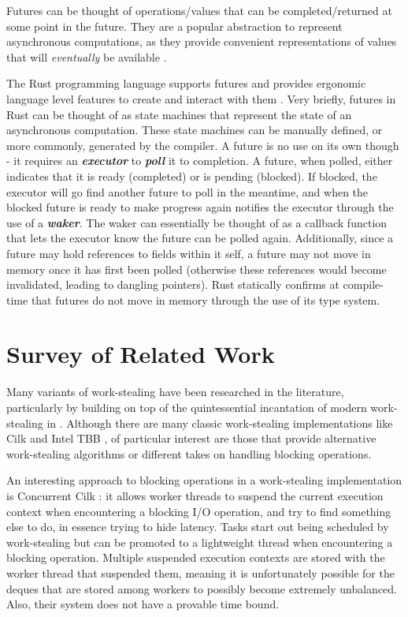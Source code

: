 \documentclass[bsc,frontabs,singlespacing,parskip,deptreport,normalheadings]{infthesis}
\begin{document}
Futures can be thought of operations/values that can be completed/returned at
some point in the future. They are a popular abstraction to represent
asynchronous computations, as they provide convenient representations of values
that will \textit{eventually} be available \cite{halstead_implementation_1984,
halstead_multilisp_1985}.

The Rust programming language supports futures and provides ergonomic language
level features to create and interact with them \cite{noauthor_future_nodate}.
Very briefly, futures in Rust can be thought of as state machines that represent
the state of an asynchronous computation. These state machines can be manually
defined, or more commonly, generated by the compiler. A future is no use on its
own though - it requires an \textit{\textbf{executor}} to \textbf{\textit{poll}}
it to completion. A future, when polled, either indicates that it is ready
(completed) or is pending (blocked). If blocked, the executor will go find
another future to poll in the meantime, and when the blocked future is ready to
make progress again notifies the executor through the use of a
\textbf{\textit{waker}}. The waker can essentially be thought of as a callback
function that lets the executor know the future can be polled again.
Additionally, since a future may hold references to fields within it self, a
future may not move in memory once it has first been polled (otherwise these
references would become invalidated, leading to dangling pointers). Rust
statically confirms at compile-time that futures do not move in memory through
the use of its type system.

\section{Survey of Related Work}
\label{section:survey_of_related_work}

Many variants of work-stealing have been researched in the literature,
particularly by building on top of the quintessential incantation of modern
work-stealing in \cite{arora_thread_1998}. Although there are many classic
work-stealing implementations like Cilk \cite{frigo_implementation_1998} and Intel
TBB \cite{noauthor_advanced_nodate}, of particular interest are those that
provide alternative work-stealing algorithms or different takes on handling
blocking operations.

An interesting approach to blocking operations in a work-stealing implementation
is Concurrent Cilk \cite{zakian_concurrent_2016}: it allows worker threads to
suspend the current execution context when encountering a blocking I/O
operation, and try to find something else to do, in essence trying to hide
latency. Tasks start out being scheduled by work-stealing but can be promoted to
a lightweight thread when encountering a blocking operation. Multiple suspended
execution contexts are stored with the worker thread that suspended them,
meaning it is unfortunately possible for the deques that are stored among
workers to possibly become extremely unbalanced. Also, their system does not
have a provable time bound.
\end{document}
